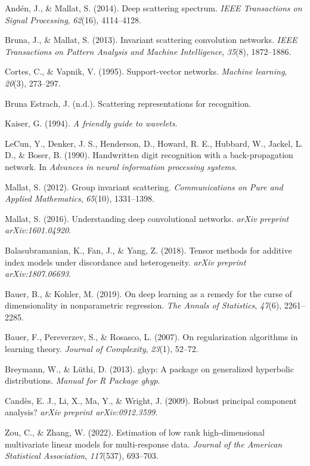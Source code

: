 \documentclass{article}
\begin{document}
\begin{thebibliography}{99}
 Andén, J., \& Mallat, S. (2014). Deep scattering spectrum. \textit{IEEE Transactions on Signal Processing}, \textit{62}(16), 4114–4128.

 Bruna, J., \& Mallat, S. (2013). Invariant scattering convolution networks. \textit{IEEE Transactions on Pattern Analysis and Machine Intelligence}, \textit{35}(8), 1872–1886.

 Cortes, C., \& Vapnik, V. (1995). Support-vector networks. \textit{Machine learning}, \textit{20}(3), 273–297.

 Bruna Estrach, J. (n.d.). Scattering representations for recognition.

 Kaiser, G. (1994). \textit{A friendly guide to wavelets}.

 LeCun, Y., Denker, J. S., Henderson, D., Howard, R. E., Hubbard, W., Jackel, L. D., \& Boser, B. (1990). Handwritten digit recognition with a back-propagation network. In \textit{Advances in neural information processing systems}.

 Mallat, S. (2012). Group invariant scattering. \textit{Communications on Pure and Applied Mathematics}, \textit{65}(10), 1331–1398.

 Mallat, S. (2016). Understanding deep convolutional networks. \textit{arXiv preprint arXiv:1601.04920}.

 Balasubramanian, K., Fan, J., \& Yang, Z. (2018). Tensor methods for additive index models under discordance and heterogeneity. \textit{arXiv preprint arXiv:1807.06693}.

 Bauer, B., \& Kohler, M. (2019). On deep learning as a remedy for the curse of dimensionality in nonparametric regression. \textit{The Annals of Statistics}, \textit{47}(6), 2261–2285.

 Bauer, F., Pereverzev, S., \& Rosasco, L. (2007). On regularization algorithms in learning theory. \textit{Journal of Complexity}, \textit{23}(1), 52–72.

 Breymann, W., \& Lüthi, D. (2013). ghyp: A package on generalized hyperbolic distributions. \textit{Manual for R Package ghyp}.

 Candès, E. J., Li, X., Ma, Y., \& Wright, J. (2009). Robust principal component analysis? \textit{arXiv preprint arXiv:0912.3599}.

 Zou, C., \& Zhang, W. (2022). Estimation of low rank high-dimensional multivariate linear models for multi-response data. \textit{Journal of the American Statistical Association}, \textit{117}(537), 693–703.


\end{thebibliography}
\end{document}
